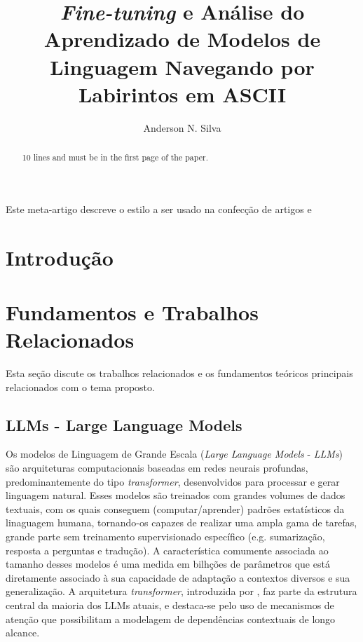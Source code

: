\documentclass[12pt]{article}
\title{\textit{Fine-tuning} e Análise do Aprendizado de Modelos de Linguagem Navegando por Labirintos em ASCII}
\author{Anderson N. Silva\inst{1}}
\begin{document}
 

\maketitle

\begin{abstract}
  10 lines and must be in the first page of the paper.
\end{abstract}
     
\begin{resumo} 
  Este meta-artigo descreve o estilo a ser usado na confecção de artigos e
\end{resumo}


\section{Introdução}

\section{Fundamentos e Trabalhos Relacionados}

Esta seção discute os trabalhos relacionados e os fundamentos teóricos principais relacionados com o tema proposto.

\subsection{LLMs - Large Language Models}

Os modelos de Linguagem de Grande Escala (\textit{Large Language Models} - \textit{LLMs}) são arquiteturas computacionais baseadas em redes neurais profundas, predominantemente do tipo \textit{transformer}, desenvolvidos para processar e gerar linguagem natural. Esses modelos são treinados com grandes volumes de dados textuais, com os quais conseguem (computar/aprender) padrões estatísticos da linaguagem humana, tornando-os capazes de realizar uma ampla gama de tarefas, grande parte sem treinamento supervisionado específico (e.g. sumarização, resposta a perguntas e tradução). A característica comumente associada ao tamanho desses modelos é uma medida em bilhções de parâmetros que está diretamente associado à sua capacidade de adaptação a contextos diversos e sua generalização. A arquitetura \textit{transformer}, introduzida por \cite{ref:transformers}, faz parte da estrutura central da maioria dos LLMs atuais, e destaca-se pelo uso de mecanismos de atenção que possibilitam a modelagem de dependências contextuais de longo alcance. 
\end{document}
